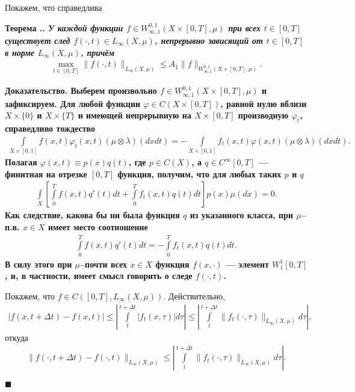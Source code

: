 \documentclass{report}
\newcounter{rem}[section]
\newcounter{theor}[section]
\renewcommand{\thetheor}{\thesection.\arabic{theor}}
\newenvironment{Theorem}{\par\refstepcounter{theor}\bf Теорема \thetheor. \it}{\rm\par}
\newenvironment{Proof}{\par\noindent\bf Доказательство.\rm}{ $\blacksquare$\par}
\begin{document}
Покажем, что справедлива
\begin{Theorem}\label{W:01:infty1::abstr::embedding}
У каждой функции $f\in W^{0,1}_{\infty,1}(X\times[0,T],\mu)$ при всех $t\in[0,T]$ существует след $f(\cdot,t)\in L_\infty(X,\mu)$, непрерывно зависящий от $t\in[0,T]$ в норме
$L_\infty(X,\mu)$, причём
\begin{gather}\label{W:01:infty1::abstr::embedding:::estimate}
    \max\limits_{t\in[0,T]}\|f(\cdot,t)\|_{L_\infty(X,\mu)}\leqslant A_1\|f\|_{W^{0,1}_{\infty,1}(X\times[0,T],\mu)}.
\end{gather}
\end{Theorem}
\begin{Proof} Выберем произвольно $f\in W^{0,1}_{\infty,1}(X\times[0,T],\mu)$ и зафиксируем. Для любой функции $\varphi\in C(X\times[0,T])$, равной нулю вблизи $X\times\{0\}$ и
$X\times\{T\}$ и имеющей непрерывную на $X\times[0,T]$ производную $\varphi_t$, справедливо тождество
\begin{gather*}
\int\limits_{X\times[0,1]}f(x,t)\varphi_t(x,t)(\mu\otimes\lambda)(dxdt)=-\int\limits_{X\times[0,1]}f_t(x,t)\varphi(x,t)(\mu\otimes\lambda)(dxdt).
\end{gather*}
Полагая $\varphi(x,t)\equiv p(x)q(t)$, где $p\in C(X)$, а $q\in C^\infty[0,T]$ --- финитная на отрезке $[0,T]$ функция, получим, что для любых таких $p$ и $q$
\begin{gather*}
\int\limits_X\left[\int\limits_0^Tf(x,t)q'(t)dt+\int\limits_0^Tf_t(x,t)q(t)dt\right]p(x)\mu(dx)=0.
\end{gather*}
Как следствие, какова бы ни была функция $q$ из указанного класса, при $\mu$--п.в. $x\in X$ имеет место соотношение
\begin{gather*}
\int\limits_0^Tf(x,t)q'(t)dt=-\int\limits_0^Tf_t(x,t)q(t)dt.
\end{gather*}
В силу этого при $\mu$--почти всех $x\in X$ функция $f(x,\cdot)$  --- элемент $W^1_1[0,T]$, и, в частности, имеет смысл говорить о следе $f(\cdot,t)$.

Покажем, что $f\in C([0,T],L_\infty(X,\mu))$. Действительно,
\begin{gather*}
|f(x,t+\Delta t)-f(x,t)|\leqslant\left|\int\limits_t^{t+\Delta t}|f_t(x,\tau)|d\tau\right|\leqslant\left|\int\limits_t^{t+\Delta t}\|f_t(\cdot,\tau)\|_{L_\infty(X,\mu)}d\tau\right|,
\end{gather*}
откуда
\begin{gather*}
\|f(\cdot,t+\Delta t)-f(\cdot,t)\|_{L_\infty(X,\mu)}\leqslant\left|\int\limits_t^{t+\Delta t}\|f_t(\cdot,\tau)\|_{L_\infty(X,\mu)}d\tau\right|.
\end{gather*}


\end{Proof}
\end{document}
